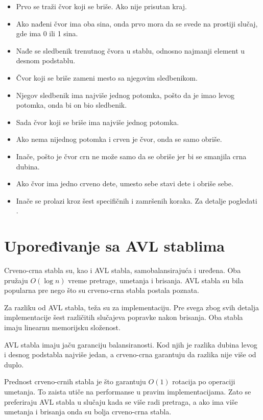 \documentclass[a4paper]{article}
\begin{document}
\begin{itemize}
    \item Prvo se traži čvor koji se briše. Ako nije prisutan kraj.
    \item Ako nađeni čvor ima oba sina, onda prvo mora da se svede na prostiji slučaj, gde ima 0 ili 1 sina.
    \item Nađe se sledbenik trenutnog čvora u stablu, odnosno najmanji element u desnom podstablu.
    \item Čvor koji se briše zameni mesto sa njegovim sledbenikom.
    \item Njegov sledbenik ima najviše jednog potomka, pošto da je imao levog potomka, onda bi on bio sledbenik.
    \item Sada čvor koji se briše ima najviše jednog potomka. 
    \item Ako nema nijednog potomka i crven je čvor, onda se samo obriše.
    \item Inače, pošto je čvor crn ne može samo da se obriše jer bi se smanjila crna dubina.
    \item Ako čvor ima jedno crveno dete, umesto sebe stavi dete i obriše sebe.
    \item Inače se prolazi kroz šest specifičnih i zamršenih koraka. Za detalje pogledati \cite{cases} \cite{clrs}.
\end{itemize}

\section{Upoređivanje sa AVL stablima}
    Crveno-crna stabla su, kao i AVL stabla, samobalansirajuća i uređena. Oba pružaju $O(\log n)$ vreme pretrage, umetanja i brisanja.
    AVL stabla su bila popularna pre nego što su crveno-crna stabla postala poznata.

    Za razliku od AVL stabla, teža su za implementaciju. Pre svega zbog svih detalja implementacije šest različitih slučajeva 
    popravke nakon brisanja.
    Oba stabla imaju linearnu memorijsku složenost.

    AVL stabla imaju jaču garanciju balansiranosti. Kod njih je razlika dubina levog i desnog podstabla najviše jedan, a crveno-crna garantuju da razlika nije više od duplo.

    Prednost crveno-crnih stabla je što garantuju $O(1)$ rotacija po operaciji umetanja. 
    To zaista utiče na performanse u pravim implementacijama. Zato se preferiraju 
    AVL stabla u slučaju kada se više radi pretraga, a ako ima više umetanja i brisanja onda
    su bolja crveno-crna stabla.
\end{document}
